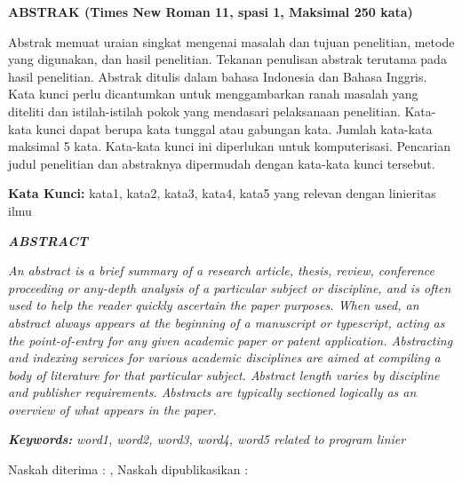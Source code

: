 \vspace{4pt}
{\small %
    \begin{center}
        \textbf{ABSTRAK (Times New Roman 11, spasi 1, Maksimal 250 kata)}
    \end{center}
    \noindent Abstrak memuat uraian singkat mengenai masalah dan tujuan penelitian, metode yang digunakan, dan hasil penelitian. Tekanan penulisan abstrak terutama pada hasil penelitian. Abstrak ditulis dalam bahasa Indonesia dan Bahasa Inggris. Kata kunci perlu dicantumkan untuk menggambarkan ranah masalah yang diteliti dan istilah-istilah pokok yang mendasari pelaksanaan penelitian. Kata-kata kunci dapat berupa kata tunggal atau gabungan kata. Jumlah kata-kata maksimal 5 kata. Kata-kata kunci ini diperlukan untuk komputerisasi. Pencarian judul penelitian dan abstraknya dipermudah dengan kata-kata kunci tersebut.

    \vspace{4pt}
    \noindent\textbf{Kata Kunci:} kata1, kata2, kata3, kata4, kata5 yang relevan dengan linieritas ilmu

    \vspace{10pt}
    \begin{center}
        \textit{\textbf{ABSTRACT}}
    \end{center}
    \noindent\textit{An abstract is a brief summary of a research article, thesis, review, conference proceeding or any-depth analysis of a particular subject or discipline, and is often used to help the reader quickly ascertain the paper purposes. When used, an abstract always appears at the beginning of a manuscript or typescript, acting as the point-of-entry for any given academic paper or patent application. Abstracting and indexing services for various academic disciplines are aimed at compiling a body of literature for that particular subject. Abstract length varies by discipline and publisher requirements. Abstracts are typically sectioned logically as an overview of what appears in the paper.}

    \vspace{4pt}
    \noindent\textit{\textbf{Keywords:}} \textit{word1, word2, word3, word4, word5 related to program linier}
}

\vspace{12pt}
\noindent Naskah diterima : \tglditerima, Naskah dipublikasikan : \tgldipublikasikan